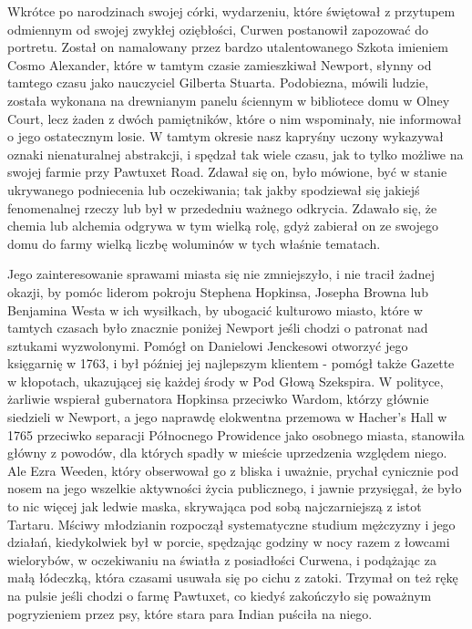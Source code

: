 Wkrótce po narodzinach swojej córki, wydarzeniu, które świętował z przytupem odmiennym od swojej zwykłej oziębłości, Curwen postanowił zapozować do portretu. Został on namalowany przez bardzo utalentowanego Szkota imieniem Cosmo Alexander, które w tamtym czasie zamieszkiwał Newport, słynny od tamtego czasu jako nauczyciel Gilberta Stuarta. Podobiezna, mówili ludzie, została wykonana na drewnianym panelu ściennym w bibliotece domu w Olney Court, lecz żaden z dwóch pamiętników, które o nim wspominały, nie informował o jego ostatecznym losie. W tamtym okresie nasz kapryśny uczony wykazywał oznaki nienaturalnej abstrakcji, i spędzał tak wiele czasu, jak to tylko możliwe na swojej farmie przy Pawtuxet Road. Zdawał się on, było mówione, być w stanie ukrywanego podniecenia lub oczekiwania; tak jakby spodziewał się jakiejś fenomenalnej rzeczy lub był w przededniu ważnego odkrycia. Zdawało się, że chemia lub alchemia odgrywa w tym wielką rolę, gdyż zabierał on ze swojego domu do farmy wielką liczbę woluminów w tych właśnie tematach.

Jego zainteresowanie sprawami miasta się nie zmniejszyło, i nie tracił żadnej okazji, by pomóc liderom pokroju Stephena Hopkinsa, Josepha Browna lub Benjamina Westa w ich wysiłkach, by ubogacić kulturowo miasto, które w tamtych czasach było znacznie poniżej Newport jeśli chodzi o patronat nad sztukami wyzwolonymi. Pomógł on Danielowi Jenckesowi otworzyć jego księgarnię w 1763, i był później jej najlepszym klientem - pomógł także Gazette w kłopotach, ukazującej się każdej środy w Pod Głową Szekspira. W polityce, żarliwie wspierał gubernatora Hopkinsa przeciwko Wardom, którzy głównie siedzieli w Newport, a jego naprawdę elokwentna przemowa w Hacher's Hall w 1765 przeciwko separacji Północnego Prowidence jako osobnego miasta, stanowiła główny z powodów, dla których spadły w  mieście uprzedzenia względem niego. Ale Ezra Weeden, który obserwował go z bliska i uważnie, prychał cynicznie pod nosem na jego wszelkie aktywności życia publicznego, i jawnie przysięgał, że było to nic więcej jak ledwie maska, skrywająca pod sobą najczarniejszą z istot Tartaru. Mściwy młodzianin rozpoczął systematyczne studium mężczyzny i jego działań, kiedykolwiek był w porcie, spędzając godziny w nocy razem z łowcami wielorybów, w oczekiwaniu na światła z posiadłości Curwena, i podążając za małą łódeczką, która czasami usuwała się po cichu z zatoki. Trzymał on też rękę na pulsie jeśli chodzi o farmę Pawtuxet, co kiedyś zakończyło się poważnym pogryzieniem przez psy, które stara para Indian puściła na niego. 

